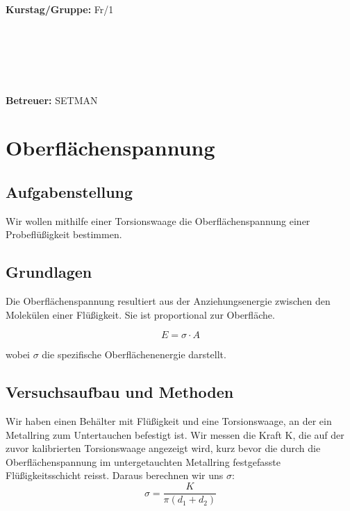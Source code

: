 \documentclass{article}
\begin{document}
\begin{verbatim}


\end{verbatim}
			\begin{flushleft}
			\textbf{\Large{Kurstag/Gruppe:}} \Large{Fr/1}
			\end{flushleft}

\begin{verbatim}






\end{verbatim}
			\begin{flushleft}
			\LARGE{\textbf{Betreuer:}}	\Large{SETMAN}	
			\end{flushleft}
\newpage
\section{Oberflächenspannung}
\subsection{Aufgabenstellung}
Wir wollen mithilfe einer Torsionswaage die Oberflächenspannung einer Probeflüßigkeit bestimmen. 
\subsection{Grundlagen}
Die Oberflächenspannung resultiert aus der Anziehungsenergie zwischen den Molekülen einer Flüßigkeit. Sie ist proportional zur Oberfläche.

\begin{equation} 
E=\sigma \cdot A
\end{equation}

wobei $\sigma$ die spezifische Oberflächenenergie darstellt.
\subsection{Versuchsaufbau und Methoden}
Wir haben einen Behälter mit Flüßigkeit und eine Torsionswaage, an der ein Metallring zum Untertauchen befestigt ist. Wir messen die Kraft K, die auf der zuvor kalibrierten Torsionswaage angezeigt wird, kurz bevor die durch die Oberflächenspannung im untergetauchten Metallring festgefasste Flüßigkeitsschicht reisst. Daraus berechnen wir uns $\sigma$:
\begin{equation}
\label{sigma}
\sigma=\frac{K}{\pi(d_1+d_2)}
\end{equation}
\end{document}
